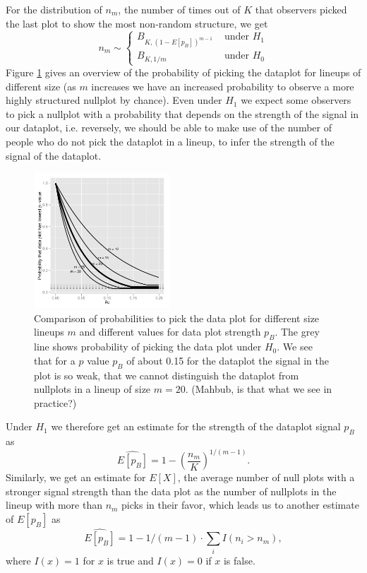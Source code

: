 \documentclass[11pt]{article}
\begin{document}
For the distribution of $n_m$, the number of times out of $K$ that observers picked the last plot to show the most non-random structure, we get
\[
n_m\sim \left \{ 
\begin{array}{cl}
B_{K, (1-E[p_B])^{m-1}} & \text { under } H_1\\
B_{K, 1/m} & \text { under } H_0
\end{array}
\right .
\]
Figure \ref{power} gives an overview of the probability of picking the dataplot for lineups of different size (as $m$ increases we have an increased probability to observe a more highly structured nullplot by chance).
Even under $H_1$ we expect some observers to pick a nullplot with a probability that depends on the strength of the signal in our dataplot, i.e. reversely, we should be able to make use of the number of people who do not pick the dataplot in a lineup, to infer the strength of the signal of the dataplot.

\begin{figure}[htbp] %
   \centering
   \includegraphics[width=2in]{images/powerplot.pdf} 
   \caption{Comparison of probabilities to pick the data plot for different size lineups $m$ and different values for data plot strength $p_B$. The grey line shows probability of picking the data plot under $H_0$. We see that for a $p$ value $p_B$ of about 0.15 for the dataplot the signal in the plot is so weak, that we cannot distinguish the dataplot from nullplots in a lineup of size $m=20$. (Mahbub, is that what we see in practice?)}
   \label{power}
\end{figure}
Under $H_1$ we therefore get an estimate for the strength of the dataplot signal $p_B$ as
\[
\widehat{E[p_B]} = 1 - \left( \frac{n_m}{K} \right)^{1/(m-1)}.
\]
Similarly, we get an estimate for $E[X]$, the average number of null plots with a stronger signal strength than the data plot as the number of nullplots in the lineup with more than $n_m$ picks in their favor, which leads us to another estimate of $E[p_B]$ as 
\[
\widehat{E[p_B]}  = 1 - 1/(m-1) \cdot \sum_i I (n_i > n_m),
\]
where $I(x) = 1$ for $x$ is true and $I(x) = 0$ if $x$ is false.
\end{document}
